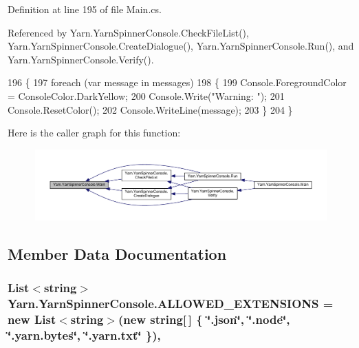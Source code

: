 Definition at line 195 of file Main.\-cs.



Referenced by Yarn.\-Yarn\-Spinner\-Console.\-Check\-File\-List(), Yarn.\-Yarn\-Spinner\-Console.\-Create\-Dialogue(), Yarn.\-Yarn\-Spinner\-Console.\-Run(), and Yarn.\-Yarn\-Spinner\-Console.\-Verify().


\begin{DoxyCode}
196         \{
197             \textcolor{keywordflow}{foreach} (var message \textcolor{keywordflow}{in} messages)
198             \{
199                 Console.ForegroundColor = ConsoleColor.DarkYellow;
200                 Console.Write(\textcolor{stringliteral}{"Warning: "});
201                 Console.ResetColor();
202                 Console.WriteLine(message);
203             \}
204         \}
\end{DoxyCode}


Here is the caller graph for this function\-:
\nopagebreak
\begin{figure}[H]
\begin{center}
\leavevmode
\includegraphics[width=350pt]{a00197_a979bb6f049b6c5294f745a19e24ddd9d_icgraph}
\end{center}
\end{figure}




\subsection{Member Data Documentation}
\hypertarget{a00197_a0979de7ea02c8c0375b8220a12e6575e}{
\subsubsection[{A\-L\-L\-O\-W\-E\-D\-\_\-\-E\-X\-T\-E\-N\-S\-I\-O\-N\-S}]{\setlength{\rightskip}{0pt plus 5cm}List$<$string$>$ Yarn.\-Yarn\-Spinner\-Console.\-A\-L\-L\-O\-W\-E\-D\-\_\-\-E\-X\-T\-E\-N\-S\-I\-O\-N\-S = new List$<$string$>$(new string\mbox{[}$\,$\mbox{]} \{ \char`\"{}.json\char`\"{}, \char`\"{}.node\char`\"{}, \char`\"{}.yarn.\-bytes\char`\"{}, \char`\"{}.yarn.\-txt\char`\"{} \})\hspace{0.3cm}{\ttfamily [static]}, {\ttfamily [package]}}}\label{a00197_a0979de7ea02c8c0375b8220a12e6575e}


